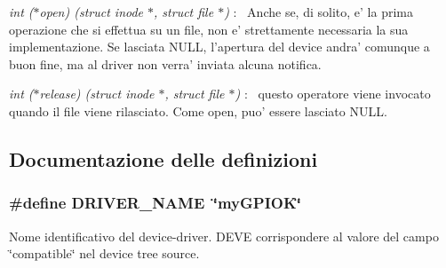 \begin{DoxyItemize}
\item {\itshape int ($\ast$open) (struct inode $\ast$, struct file $\ast$)} \+:~\newline
 Anche se, di solito, e' la prima operazione che si effettua su un file, non e' strettamente necessaria la sua implementazione. Se lasciata N\+U\+L\+L, l'apertura del device andra' comunque a buon fine, ma al driver non verra' inviata alcuna notifica.
\item {\itshape int ($\ast$release) (struct inode $\ast$, struct file $\ast$)} \+:~\newline
 questo operatore viene invocato quando il file viene rilasciato. Come open, puo' essere lasciato N\+U\+L\+L. 
\end{DoxyItemize}

\subsection{Documentazione delle definizioni}
\hypertarget{group___kernel-_module_ga25634d21648ca7fb7a2aca614bafaaeb}{
\subsubsection[{D\+R\+I\+V\+E\+R\+\_\+\+N\+A\+M\+E}]{\setlength{\rightskip}{0pt plus 5cm}\#define D\+R\+I\+V\+E\+R\+\_\+\+N\+A\+M\+E~\char`\"{}my\+G\+P\+I\+O\+K\char`\"{}}}\label{group___kernel-_module_ga25634d21648ca7fb7a2aca614bafaaeb}


Nome identificativo del device-\/driver. D\+E\+V\+E corrispondere al valore del campo \char`\"{}compatible\char`\"{} nel device tree source. 



